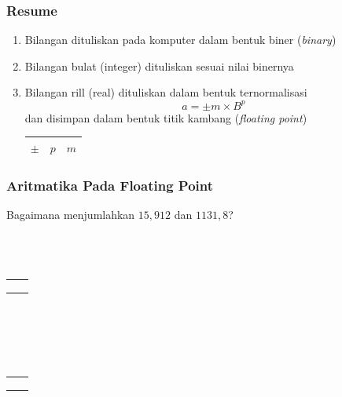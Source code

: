 \documentclass{beamer}
\begin{document}

\begin{frame}
\frametitle{Resume}
\begin{enumerate}
\item Bilangan dituliskan pada komputer dalam bentuk biner (\textit{binary})
\item Bilangan bulat (integer) dituliskan sesuai nilai binernya
\item Bilangan rill (real) dituliskan dalam bentuk ternormalisasi
\begin{equation}
a = \pm m \times B^p
\nonumber
\end{equation}
dan disimpan dalam bentuk titik kambang (\textit{floating point})
\begin{center}
\begin{tabular}{|c|c|c|}
\hline
	$\pm$ & $p$ & $m$\\
\hline
\end{tabular}
\end{center}

\end{enumerate}
\end{frame}


\begin{frame}
\frametitle{Aritmatika Pada Floating Point}
Bagaimana menjumlahkan $15,912$ dan $1131,8$?
\\\ \\\ 
\\\ \\\begin{tabular}{rl}
	& \\
	& \\
	& \\
\end{tabular}
\\\ \\\ 
\\\ \\\begin{tabular}{rl}
	& \\
	& \\
	& \\
\end{tabular}

\end{frame}

\end{document}
